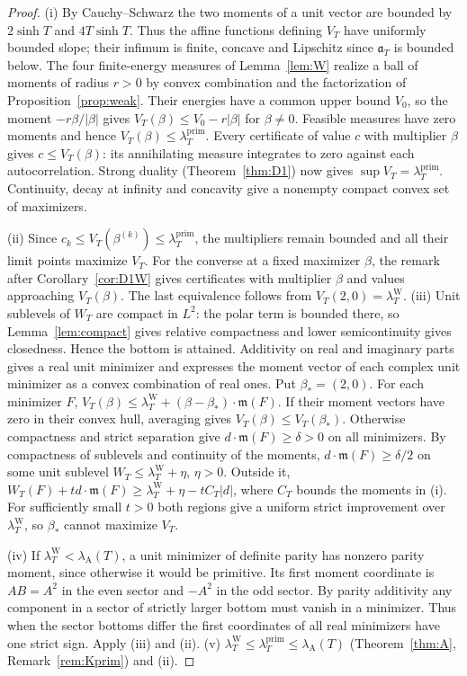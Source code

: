 \documentclass[10pt]{amsart}
\theoremstyle{definition}
\theoremstyle{remark}
\newcommand{\lamP}{\lambda^{\mathrm{prim}}_T}
\newcommand{\lamW}{\lambda^{\mathrm W}_T}
\newcommand{\lamA}{\lambda_{\mathrm A}(T)}
\begin{document}
\begin{proof}
(i) By Cauchy--Schwarz the two moments of a unit vector are bounded
by $2\sinh T$ and $4T\sinh T$. Thus the affine functions defining
$V_T$ have uniformly bounded slope; their infimum is finite, concave
and Lipschitz since $\mathfrak a_T$ is bounded below.
The four finite-energy measures of Lemma~\ref{lem:W} realize a ball
of moments of radius $r>0$ by convex combination and the factorization
of Proposition~\ref{prop:weak}. Their energies have a common upper
bound $V_0$, so the moment $-r\beta/|\beta|$ gives
$V_T(\beta)\le V_0-r|\beta|$ for $\beta\ne0$. Feasible measures
have zero moments and hence $V_T(\beta)\le\lamP$. Every certificate
of value $c$ with multiplier $\beta$ gives $c\le V_T(\beta)$:
its annihilating measure integrates to zero against each autocorrelation.
Strong duality (Theorem~\ref{thm:D1}) now gives $\sup V_T=\lamP$.
Continuity, decay at infinity and concavity give a nonempty compact
convex set of maximizers.

(ii) Since $c_k\le V_T(\beta^{(k)})\le\lamP$, the multipliers
remain bounded and all their limit points maximize $V_T$.
For the converse at a fixed maximizer $\beta$, the remark after
Corollary~\ref{cor:D1W} gives certificates with multiplier $\beta$ and
values approaching $V_T(\beta)$. The last equivalence follows
from $V_T(2,0)=\lamW$.
(iii) Unit sublevels of $W_T$ are compact in $L^2$: the polar
term is bounded there, so Lemma~\ref{lem:compact} gives relative
compactness and lower semicontinuity gives closedness. Hence the
bottom is attained. Additivity on real and imaginary parts gives
a real unit minimizer and expresses the moment vector of each
complex unit minimizer as a convex combination of real ones.
Put $\beta_*=(2,0)$. For each minimizer $F$,
$V_T(\beta)\le\lamW+(\beta-\beta_*)\cdot\mathfrak m(F)$.
If their moment vectors have zero in their convex hull, averaging
gives $V_T(\beta)\le V_T(\beta_*)$. Otherwise compactness and
strict separation give $d\cdot\mathfrak m(F)\ge\delta>0$ on all
minimizers. By compactness of sublevels and continuity of the moments,
$d\cdot\mathfrak m(F)\ge\delta/2$ on some unit sublevel
$W_T\le\lamW+\eta$, $\eta>0$. Outside it,
$W_T(F)+t d\cdot\mathfrak m(F)\ge\lamW+\eta-t C_T|d|$,
where $C_T$ bounds the moments in (i). For sufficiently small $t>0$
both regions give a uniform strict improvement over $\lamW$,
so $\beta_*$ cannot maximize $V_T$.

(iv) If $\lamW<\lamA$, a unit minimizer of definite parity
has nonzero parity moment, since otherwise it would be primitive.
Its first moment coordinate is $A B=A^2$ in the even sector and
$-A^2$ in the odd sector. By parity additivity any component
in a sector of strictly larger bottom must vanish in a minimizer.
Thus when the sector bottoms differ the first coordinates of all
real minimizers have one strict sign. Apply (iii) and (ii).
(v) $\lamW\le\lamP\le\lamA$ (Theorem~\ref{thm:A}, Remark~\ref{rem:Kprim}) and (ii).
\end{proof}
\end{document}
